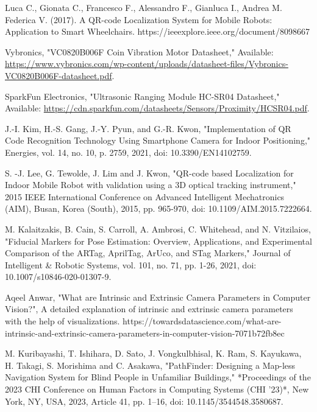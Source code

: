 \begin{thebibliography}{9}
	Luca C., Gionata C., Francesco F., Alessandro F., Gianluca I., Andrea M. Federica V. (2017). A QR-code Localization System for Mobile Robots: Application to Smart Wheelchairs.
	https://ieeexplore.ieee.org/document/8098667
	
	Vybronics, "VC0820B006F Coin Vibration Motor Datasheet," 
	Available: \url{https://www.vybronics.com/wp-content/uploads/datasheet-files/Vybronics-VC0820B006F-datasheet.pdf}.
	
	
	SparkFun Electronics, "Ultrasonic Ranging Module HC-SR04 Datasheet," 
	Available: \url{https://cdn.sparkfun.com/datasheets/Sensors/Proximity/HCSR04.pdf}.
	
	
	J.-I. Kim, H.-S. Gang, J.-Y. Pyun, and G.-R. Kwon, "Implementation of QR Code Recognition Technology Using Smartphone Camera for Indoor Positioning," Energies, vol. 14, no. 10, p. 2759, 2021, doi: 10.3390/EN14102759.
	
	S. -J. Lee, G. Tewolde, J. Lim and J. Kwon, "QR-code based Localization for Indoor Mobile Robot with validation using a 3D optical tracking instrument," 2015 IEEE International Conference on Advanced Intelligent Mechatronics (AIM), Busan, Korea (South), 2015, pp. 965-970, doi: 10.1109/AIM.2015.7222664.
	
	M. Kalaitzakis, B. Cain, S. Carroll, A. Ambrosi, C. Whitehead, and N. Vitzilaios, "Fiducial Markers for Pose Estimation: Overview, Applications, and Experimental Comparison of the ARTag, AprilTag, ArUco, and STag Markers," Journal of Intelligent \& Robotic Systems, vol. 101, no. 71, pp. 1-26, 2021, doi: 10.1007/s10846-020-01307-9.
	
	Aqeel Anwar, "What are Intrinsic and Extrinsic Camera Parameters in Computer Vision?", A detailed explanation of intrinsic and extrinsic camera parameters with the help of visualizations.
	https://towardsdatascience.com/what-are-intrinsic-and-extrinsic-camera-parameters-in-computer-vision-7071b72fb8ec
	
	M. Kuribayashi, T. Ishihara, D. Sato, J. Vongkulbhisal, K. Ram, S. Kayukawa, H. Takagi, S. Morishima and C. Asakawa, "PathFinder: Designing a Map-less Navigation System for Blind People in Unfamiliar Buildings," *Proceedings of the 2023 CHI Conference on Human Factors in Computing Systems (CHI '23)*, New York, NY, USA, 2023, Article 41, pp. 1–16, doi: 10.1145/3544548.3580687.
	

\end{thebibliography}
